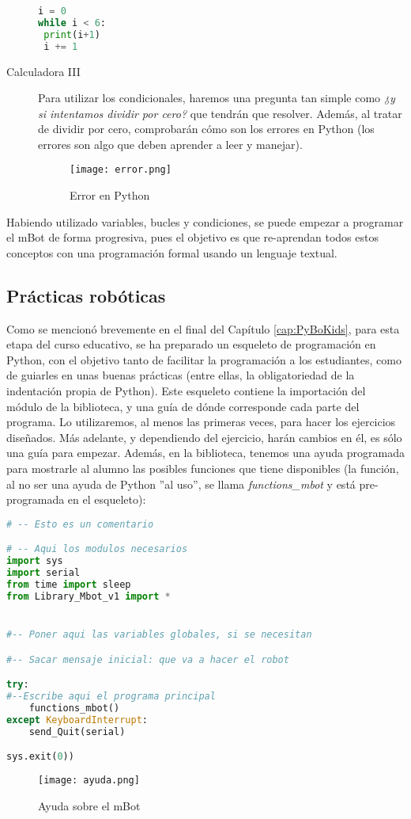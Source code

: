 \begin{description}
\begin{lstlisting}[language=python]
i = 0
while i < 6:
 print(i+1)
 i += 1
\end{lstlisting}
\item [Calculadora III] Para utilizar los condicionales, haremos una pregunta tan simple como \textit{¿y si intentamos dividir por cero?} que tendrán que resolver. Además, al tratar de dividir por cero, comprobarán cómo son los errores en Python (los errores son algo que deben aprender a leer y manejar).
\begin{figure}[H]
	\texttt{[image: error.png]}
	\centering
	\label{img:error}
	\caption{Error en Python}
\end{figure}
\end{description}

Habiendo utilizado variables, bucles y condiciones, se puede empezar a programar el mBot de forma progresiva, pues el objetivo es que re-aprendan todos estos conceptos con una programación formal usando un lenguaje textual.
\subsection{Prácticas robóticas}
Como se mencionó brevemente en el final del Capítulo \ref{cap:PyBoKids}, para esta etapa del curso educativo, se ha preparado un esqueleto de programación en Python, con el objetivo tanto de facilitar la programación a los estudiantes, como de guiarles en unas buenas prácticas (entre ellas, la obligatoriedad de la indentación propia de Python). Este esqueleto contiene la importación del módulo de la biblioteca, y una guía de dónde corresponde cada parte del programa. Lo utilizaremos, al menos las primeras veces, para hacer los ejercicios diseñados. Más adelante, y dependiendo del ejercicio, harán cambios en él, es sólo una guía para empezar. Además, en la biblioteca, tenemos una ayuda programada para mostrarle al alumno las posibles funciones que tiene disponibles (la función, al no ser una ayuda de Python ''al uso'', se llama \textit{functions\_mbot} y está pre-programada en el esqueleto):

\begin{lstlisting}[language=python,caption={Esqueleto proporcionado a modo de ejemplo}]
# -- Esto es un comentario

# -- Aqui los modulos necesarios
import sys
import serial
from time import sleep
from Library_Mbot_v1 import *


#-- Poner aqui las variables globales, si se necesitan

#-- Sacar mensaje inicial: que va a hacer el robot

try:
#--Escribe aqui el programa principal
	functions_mbot()
except KeyboardInterrupt:
	send_Quit(serial)

sys.exit(0))
\end{lstlisting}
\begin{figure}[H]
	\texttt{[image: ayuda.png]}
	\centering
	\label{img:ayuda}
	\caption{Ayuda sobre el mBot}
\end{figure}

